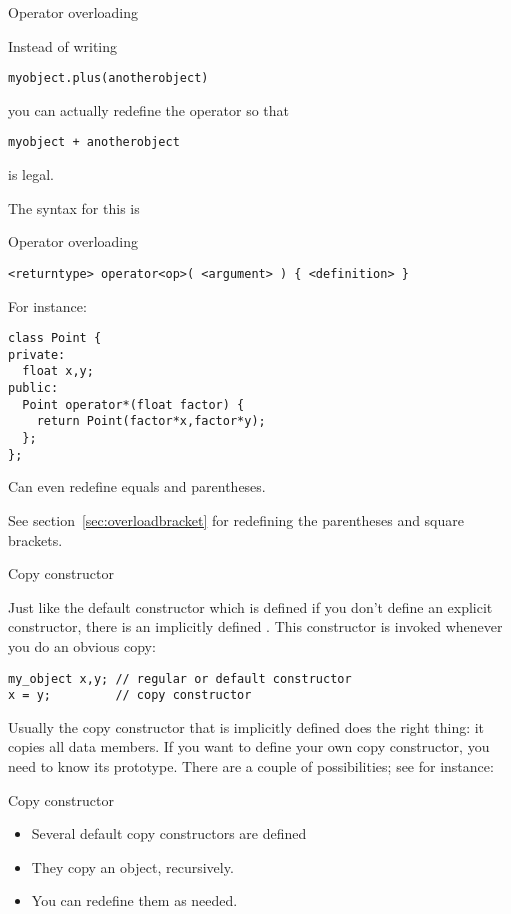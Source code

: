  {Operator overloading}
\label{sec:operatordef}

Instead of writing 
\begin{verbatim}
myobject.plus(anotherobject)
\end{verbatim}
you can actually redefine the \n{+} operator so that
\begin{verbatim}
myobject + anotherobject
\end{verbatim}
is legal.

The syntax for this is
\begin{block}{Operator overloading}
  \label{sl:object-operator}
\begin{verbatim}
<returntype> operator<op>( <argument> ) { <definition> }
\end{verbatim}
For instance:
\begin{verbatim}
class Point {
private:
  float x,y;
public:
  Point operator*(float factor) {
    return Point(factor*x,factor*y);
  };
};
\end{verbatim}
Can even redefine equals and parentheses.
\end{block}

See section~\ref{sec:overloadbracket} for redefining the parentheses
and square brackets.

 {Copy constructor}

Just like the default constructor which is defined if you don't define
an explicit constructor, there is an implicitly defined
. This constructor is invoked whenever
you do an obvious copy:
\begin{verbatim}
my_object x,y; // regular or default constructor
x = y;         // copy constructor
\end{verbatim}
Usually the copy constructor that is implicitly defined does the right
thing: it copies all data members. If you want to define your own copy
constructor, you need to know its prototype. There are a couple of
possibilities; see for instance:
%

\begin{slide}{Copy constructor}
  \label{sl:class-copy}
  \begin{multicols}{2}
    \begin{itemize}
    \item
      Several default copy constructors are defined
    \item They copy an object, recursively.
    \item You can redefine them as needed.
    \end{itemize}
    \vfill\columnbreak
  \end{multicols}
\end{slide}

